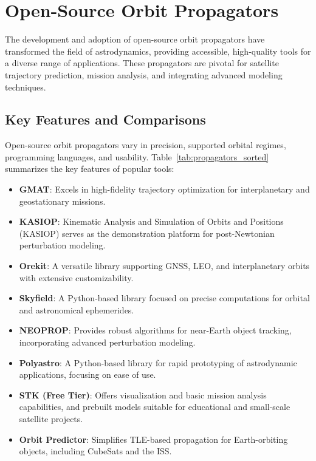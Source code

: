 \section{Open-Source Orbit Propagators}
The development and adoption of open-source orbit propagators have transformed the field of astrodynamics, providing accessible, high-quality tools for a diverse range of applications. These propagators are pivotal for satellite trajectory prediction, mission analysis, and integrating advanced modeling techniques.

\subsection{Key Features and Comparisons}
Open-source orbit propagators vary in precision, supported orbital regimes, programming languages, and usability. Table~\ref{tab:propagators_sorted} summarizes the key features of popular tools:

\begin{itemize}
    \item \textbf{GMAT}: Excels in high-fidelity trajectory optimization for interplanetary and geostationary missions.
    \item \textbf{KASIOP}: Kinematic Analysis and Simulation of Orbits and Positions (KASIOP) serves as the demonstration platform for post-Newtonian perturbation modeling. %
    \item \textbf{Orekit}: A versatile library supporting GNSS, LEO, and interplanetary orbits with extensive customizability.
    \item \textbf{Skyfield}: A Python-based library focused on precise computations for orbital and astronomical ephemerides. %
    \item \textbf{NEOPROP}: Provides robust algorithms for near-Earth object tracking, incorporating advanced perturbation modeling.
    \item \textbf{Polyastro}: A Python-based library for rapid prototyping of astrodynamic applications, focusing on ease of use.
    \item \textbf{STK (Free Tier)}: Offers visualization and basic mission analysis capabilities, and prebuilt models suitable for educational and small-scale satellite projects.
    \item \textbf{Orbit Predictor}: Simplifies TLE-based propagation for Earth-orbiting objects, including CubeSats and the ISS.
\end{itemize}


